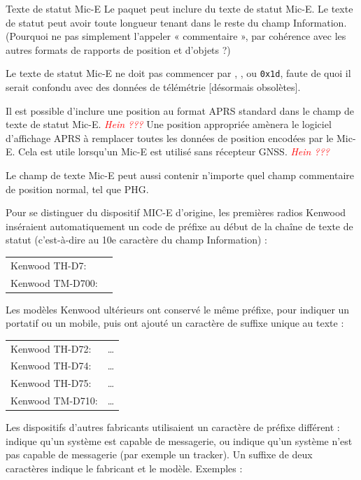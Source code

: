 \begin{aprssideblock}{Texte de statut Mic-E}
Le paquet peut inclure du texte de statut Mic-E. Le texte de statut peut avoir
toute longueur tenant dans le reste du champ Information. (Pourquoi ne pas
simplement l'appeler « commentaire », par cohérence avec les autres formats de
rapports de position et d'objets ?)

Le texte de statut Mic-E ne doit pas commencer par , , ou
\texttt{0x1d}, faute de quoi il serait confondu avec des données de
télémétrie [désormais obsolètes].

Il est possible d'inclure une position au format APRS standard dans le champ de
texte de statut Mic-E. \emph{\textcolor{red}{Hein ???}} Une position appropriée amènera le
logiciel d'affichage APRS à remplacer toutes les données de position encodées
par le Mic-E. Cela est utile lorsqu'un Mic-E est utilisé sans récepteur GNSS.
\emph{\textcolor{red}{Hein ???}}

Le champ de texte Mic-E peut aussi contenir n'importe quel champ commentaire de
position normal, tel que PHG.

Pour se distinguer du dispositif MIC-E d'origine, les premières radios Kenwood
inséraient automatiquement un code de préfixe au début de la chaîne de texte de
statut (c'est-à-dire au 10e caractère du champ Information) :

\begin{tabular}[t]{@{}ll@{}}
Kenwood TH-D7: & \lit{>}\\
Kenwood TM-D700: & \lit{]}
\end{tabular}

Les modèles Kenwood ultérieurs ont conservé le même préfixe, pour indiquer un
portatif ou un mobile, puis ont ajouté un caractère de suffixe unique au texte :

\begin{tabular}[t]{@{}ll@{}}
Kenwood TH-D72: & \lit{>} \ldots \lit{=}\\
Kenwood TH-D74: & \lit{>} \ldots \lit{\textasciicircum}\\
Kenwood TH-D75: & \lit{>} \ldots \lit{\&}\\
Kenwood TM-D710: & \lit{]} \ldots \lit{=}
\end{tabular}

Les dispositifs d'autres fabricants utilisaient un caractère de préfixe
différent :
 indique qu'un système est capable de messagerie, ou
 indique qu'un système n'est pas capable de messagerie (par exemple un
tracker). Un suffixe de deux caractères indique le fabricant et le modèle.
Exemples :


\end{aprssideblock}
